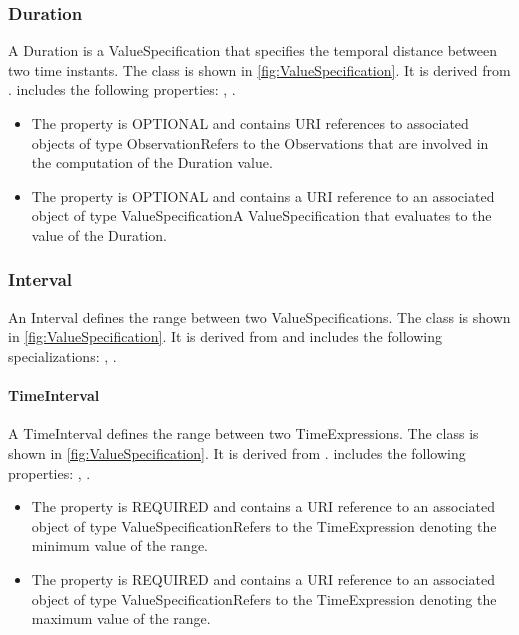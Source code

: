 \subsubsection{Duration}%
\label{sec:uml:Duration}%
A Duration is a ValueSpecification that specifies the temporal distance between two time instants.%
\linebreak%
\linebreak%
The  class is shown in \ref{fig:ValueSpecification}. It is derived from .%
 includes the following properties: , . %
\begin{itemize}%
\item%
The  property is OPTIONAL and contains URI references to associated objects of type ObservationRefers to the Observations that are involved in the computation of the Duration value.%
\item%
The  property is OPTIONAL and contains a URI reference to an associated object of type ValueSpecificationA ValueSpecification that evaluates to the value of the Duration.%
\end{itemize}%
\subsubsection{Interval}%
\label{sec:uml:Interval}%
An Interval defines the range between two ValueSpecifications.%
\linebreak%
\linebreak%
The  class is shown in \ref{fig:ValueSpecification}. It is derived from  and includes the following specializations: , . %
%
\paragraph{TimeInterval}%
\label{sec:uml:TimeInterval}%
A TimeInterval defines the range between two TimeExpressions.%
\linebreak%
\linebreak%
The  class is shown in \ref{fig:ValueSpecification}. It is derived from .%
 includes the following properties: , . %
\begin{itemize}%
\item%
The  property is REQUIRED and contains a URI reference to an associated object of type ValueSpecificationRefers to the TimeExpression denoting the minimum value of the range.%
\item%
The  property is REQUIRED and contains a URI reference to an associated object of type ValueSpecificationRefers to the TimeExpression denoting the maximum value of the range.%
\end{itemize}%
